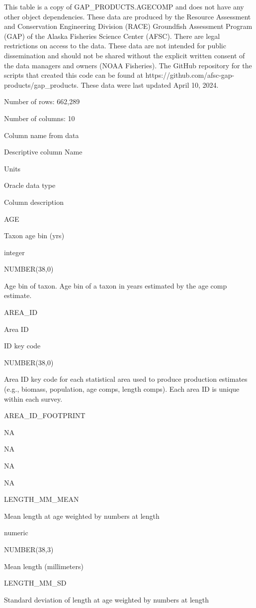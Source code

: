 \documentclass[
  letterpaper,
  oneside,
  open=any]{scrbook}
\begin{document}
This table is a copy of GAP\_PRODUCTS.AGECOMP and does not have any
other object dependencies. These data are produced by the Resource
Assessment and Conservation Engineering Division (RACE) Groundfish
Assessment Program (GAP) of the Alaska Fisheries Science Center (AFSC).
There are legal restrictions on access to the data. These data are not
intended for public dissemination and should not be shared without the
explicit written consent of the data managers and owners (NOAA
Fisheries). The GitHub repository for the scripts that created this code
can be found at https://github.com/afsc-gap-products/gap\_products.
These data were last updated April 10, 2024.

Number of rows: 662,289

Number of columns: 10

Column name from data

Descriptive column Name

Units

Oracle data type

Column description

AGE

Taxon age bin (yrs)

integer

NUMBER(38,0)

Age bin of taxon. Age bin of a taxon in years estimated by the age comp
estimate.

AREA\_ID

Area ID

ID key code

NUMBER(38,0)

Area ID key code for each statistical area used to produce production
estimates (e.g., biomass, population, age comps, length comps). Each
area ID is unique within each survey.

AREA\_ID\_FOOTPRINT

NA

NA

NA

NA

LENGTH\_MM\_MEAN

Mean length at age weighted by numbers at length

numeric

NUMBER(38,3)

Mean length (millimeters)

LENGTH\_MM\_SD

Standard deviation of length at age weighted by numbers at length
\end{document}
